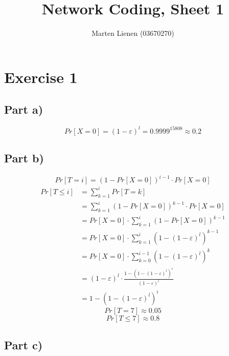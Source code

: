 \documentclass[10pt,a4paper]{article}
\title{Network Coding, Sheet 1}
\author{Marten Lienen (03670270)}
\begin{document}
\maketitle

\section*{Exercise 1}

\subsection*{Part a)}

\begin{equation*}
  Pr[X = 0] = (1 - \varepsilon)^{l} = 0.9999^{15808} \approx 0.2
\end{equation*}

\subsection*{Part b)}

\begin{equation*}
  Pr[T = i] = (1 - Pr[X = 0])^{i - 1} \cdot Pr[X = 0]
\end{equation*}
\begin{align*}
  Pr[T \le i] & = \sum_{k = 1}^{i} Pr[T = k]\\
              & = \sum_{k = 1}^{i} (1 - Pr[X = 0])^{k - 1} \cdot Pr[X = 0]\\
              & = Pr[X = 0] \cdot \sum_{k = 1}^{i} (1 - Pr[X = 0])^{k - 1}\\
              & = Pr[X = 0] \cdot \sum_{k = 1}^{i} \left( 1 - (1 - \varepsilon)^{l} \right)^{k - 1}\\
              & = Pr[X = 0] \cdot \sum_{k = 0}^{i - 1} \left( 1 - (1 - \varepsilon)^{l} \right)^{k}\\
              & = (1 - \varepsilon)^{l} \cdot \frac{1 - \left( 1 - (1 - \varepsilon)^{l} \right)^{i}}{(1 - \varepsilon)^{l}}\\
              & = 1 - \left( 1 - (1 - \varepsilon)^{l} \right)^{i}
\end{align*}
\begin{equation*}
  Pr[T = 7] \approx 0.05
\end{equation*}
\begin{equation*}
  Pr[T \le 7] \approx 0.8
\end{equation*}

\subsection*{Part c)}
\end{document}
